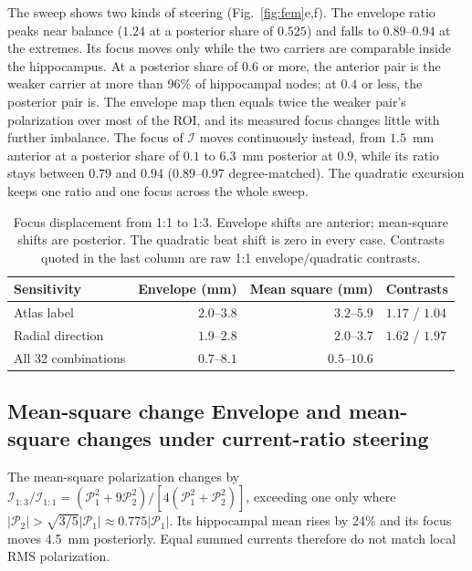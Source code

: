 \documentclass[11pt,a4paper]{article}
\providecommand{\DIFaddtex}[1]{{\protect\color{blue} \sf #1}} %
\providecommand{\DIFdeltex}[1]{{\protect\color{red} \scriptsize #1}} %
\providecommand{\DIFaddbegin}{} %
\providecommand{\DIFaddend}{} %
\providecommand{\DIFdelbegin}{} %
\providecommand{\DIFdelend}{} %
\providecommand{\DIFadd}[1]{\texorpdfstring{\DIFaddtex{#1}}{#1}} %
\providecommand{\DIFdel}[1]{\texorpdfstring{\DIFdeltex{#1}}{}} %
\begin{document}
\DIFaddbegin \DIFadd{The sweep shows two kinds of steering (Fig.~\ref{fig:fem}e,f). The envelope ratio peaks
near balance ($1.24$ at a posterior share of $0.525$) and falls to $0.89$--$0.94$ at
the extremes. Its focus moves only while the two carriers are comparable inside the
hippocampus. At a posterior share of $0.6$ or more, the anterior pair is the weaker
carrier at more than 96\% of hippocampal nodes; at $0.4$ or less, the posterior pair is. The
envelope map then equals twice the weaker pair's polarization over most of the ROI,
and its measured focus changes little with further imbalance. The focus of $\mathcal I$ moves
continuously instead, from $1.5$~mm anterior at a posterior share of $0.1$ to $6.3$~mm
posterior at $0.9$, while its ratio stays between $0.79$ and $0.94$ ($0.89$--$0.97$
degree-matched). The quadratic excursion keeps one ratio and one focus across the
whole sweep.
}

\DIFaddend \begin{table}[htbp]\centering\small
\caption{Focus displacement from 1:1 to 1:3. Envelope shifts are anterior;
mean-square shifts are posterior. The quadratic beat shift is zero in every case.
Contrasts quoted in the last column are raw 1:1 envelope/quadratic contrasts.}
\label{tab:fem-sensitivities}
\begin{tabular}{@{}lrrl@{}}
\toprule
Sensitivity & Envelope (mm) & Mean square (mm) & Contrasts\\
\midrule
Atlas label & $2.0$--$3.8$ & $3.2$--$5.9$ & $1.17$ / $1.04$\\
Radial direction & $1.9$--$2.8$ & $2.0$--$3.7$ & $1.62$ / $1.97$\\
All 32 combinations & $0.7$--$8.1$ & $0.5$--$10.6$ & \\
\bottomrule
\end{tabular}
\end{table}

\subsection{\DIFdelbegin \DIFdel{Mean-square change }\DIFdelend \DIFaddbegin \DIFadd{Envelope and mean-square changes }\DIFaddend under current-ratio steering}\label{supp:steering-algebra}
The mean-square polarization
changes by $\mathcal I_{1:3}/\mathcal I_{1:1}
=(\mathcal P_1^2+9\mathcal P_2^2)/[4(\mathcal P_1^2+\mathcal P_2^2)]$,
exceeding one only where $|\mathcal P_2|>\sqrt{3/5}|\mathcal P_1|
\approx0.775|\mathcal P_1|$. Its hippocampal mean rises by 24\% and its focus
moves 4.5~mm posteriorly. Equal summed currents therefore do not match local
RMS polarization.
\end{document}
